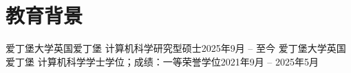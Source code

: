 \section{教育背景}
  \resumeSubHeadingListStart
    \resumeSubheading
      {爱丁堡大学}{英国爱丁堡}
      {计算机科学研究型硕士}{2025年9月 -- 至今}
    \resumeSubheading
      {爱丁堡大学}{英国爱丁堡}
      {计算机科学学士学位；成绩：一等荣誉学位}{2021年9月 -- 2025年5月}
  \resumeSubHeadingListEnd